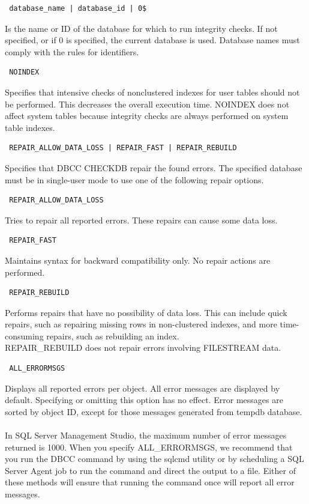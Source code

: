 \documentclass[english]{article}
\begin{document}
\begin{verbatim} database_name | database_id | 0$
\end{verbatim}
Is the name or ID of the database for which to run integrity checks. If not specified, or if 0 is specified, the current database is used. Database names must comply with the rules for identifiers.
\begin{verbatim} NOINDEX
\end{verbatim}
Specifies that intensive checks of nonclustered indexes for user tables should not be performed. This decreases the overall execution time. NOINDEX does not affect system tables because integrity checks are always performed on system table indexes.
\begin{verbatim} REPAIR_ALLOW_DATA_LOSS | REPAIR_FAST | REPAIR_REBUILD
\end{verbatim}
Specifies that DBCC CHECKDB repair the found errors. The specified database must be in single-user mode to use one of the following repair options.
\begin{verbatim} REPAIR_ALLOW_DATA_LOSS
\end{verbatim}
Tries to repair all reported errors. These repairs can cause some data loss.
\begin{verbatim} REPAIR_FAST
\end{verbatim}
Maintains syntax for backward compatibility only. No repair actions are performed.
\begin{verbatim} REPAIR_REBUILD
\end{verbatim}
Performs repairs that have no possibility of data loss. This can include quick repairs, such as repairing missing rows in non-clustered indexes, and more time-consuming repairs, such as rebuilding an index.
\\REPAIR\_REBUILD  does not repair errors involving FILESTREAM data.
\begin{verbatim} ALL_ERRORMSGS
\end{verbatim}
Displays all reported errors per object. All error messages are displayed by default. Specifying or omitting this option has no effect. Error messages are sorted by object ID, except for those messages generated from tempdb database.\\\\
In SQL Server Management Studio, the maximum number of error messages returned is 1000. When you specify ALL\_ERRORMSGS, we recommend that you run the DBCC command by using the sqlcmd utility or by scheduling a SQL Server Agent job to run the command and direct the output to a file. Either of these methods will ensure that running the command once will report all error messages.
\end{document}
